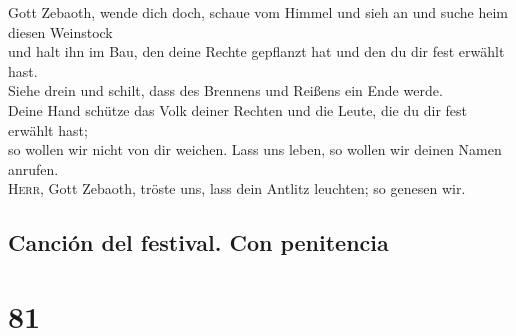  Gott Zebaoth, wende dich doch, schaue vom Himmel und
sieh an und suche heim diesen Weinstock\\
 und halt ihn im Bau, den deine Rechte gepflanzt hat und
den du dir fest erwählt hast.\\
 Siehe drein und schilt, dass des Brennens und Reißens
ein Ende werde.\\
 Deine Hand schütze das Volk deiner Rechten und die
Leute, die du dir fest erwählt hast;\\
 so wollen wir nicht von dir weichen. Lass uns leben, so
wollen wir deinen Namen anrufen.\\
 \textsc{Herr}, Gott Zebaoth, tröste uns, lass dein
Antlitz leuchten; so genesen wir.

\hypertarget{canciuxf3n-del-festival.-con-penitencia}{%
\subsection{Canción del festival. Con
penitencia}\label{canciuxf3n-del-festival.-con-penitencia}}

\hypertarget{section-80}{%
\section{81}\label{section-80}}

